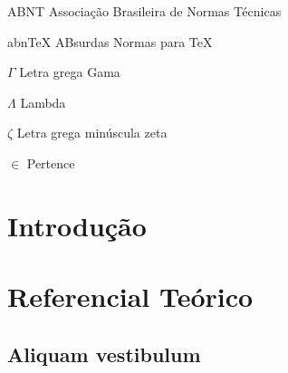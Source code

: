 \documentclass[
12pt,        %
openright,   %
twoside,     %
a4paper,     %
english,       %
brazil        %
%
%
]{ppgca}
\begin{document}

\listoftables*
\cleardoublepage

\begin{siglas}
  \item[ABNT] Associação Brasileira de Normas Técnicas
  \item[abnTeX] ABsurdas Normas para TeX
\end{siglas}

\begin{simbolos}
  \item[$ \Gamma $] Letra grega Gama
  \item[$ \Lambda $] Lambda
  \item[$ \zeta $] Letra grega minúscula zeta
  \item[$ \in $] Pertence
\end{simbolos}

\tableofcontents*
\cleardoublepage
\textual

\chapter*[Introdução]{Introdução} %

\lipsum[1-5]

\chapter{Referencial Teórico}

\lipsum[2]

\section{Aliquam vestibulum}
\end{document}
